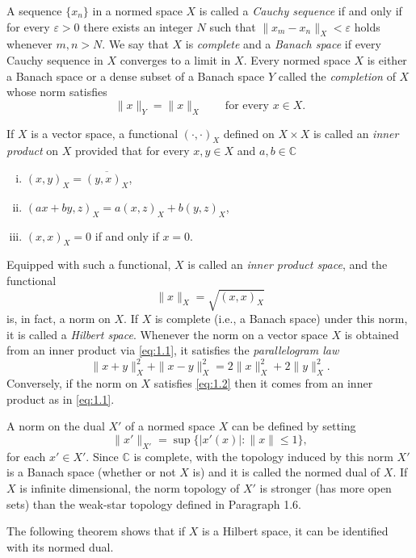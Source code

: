 \begin{para}
  A sequence $\{x_n\}$ in a normed space $X$ is called a \emph{Cauchy sequence}
  if and only if for every $\varepsilon>0$ there exists an integer $N$
  such that $\|x_m-x_n\|_X < \varepsilon$ holds whenever $m,n>N$.
  We say that $X$ is \emph{complete} and a \emph{Banach space} if every Cauchy sequence
  in $X$ converges to a limit in $X$. Every normed space $X$ is either a Banach space
  or a dense subset of a Banach space $Y$ called the \emph{completion} of $X$
  whose norm satisfies
  \[\|x\|_Y = \|x\|_X\qquad \text{for every } x\in X.\]
\end{para}


\begin{para}
  If $X$ is a vector space, a functional $(\cdot,\cdot)_X$ defined on $X\times X$
  is called an \emph{inner product} on $X$ provided that for every $x,y\in X$
  and $a,b\in \mathbb{C}$
  \begin{enumerate}[(i)]
    \item $(x,y)_X = \overline{(y,x)_X}$,
    \item $(ax+by, z)_X = a(x, z)_X + b(y, z)_X$,
    \item $(x,x)_X=0$ if and only if $x=0$.
  \end{enumerate}
  Equipped with such a functional, $X$ is called an \emph{inner product space},
  and the functional
  \begin{equation}\label{eq:1.1}
    \|x\|_X = \sqrt{(x,x)_X}
  \end{equation}
  is, in fact, a norm on $X$. If $X$ is complete (i.e., a Banach space) under this norm,
  it is called a \emph{Hilbert space}.
  Whenever the norm on a vector space $X$ is obtained from an inner product via \eqref{eq:1.1},
  it satisfies the \emph{parallelogram law}
  \begin{equation}\label{eq:1.2}
    \|x+y\|_X^2 + \|x-y\|_X^2 = 2\|x\|_X^2 + 2\|y\|_X^2.
  \end{equation}
  Conversely, if the norm on $X$ satisfies \eqref{eq:1.2} then it comes from an inner
  product as in \eqref{eq:1.1}.
\end{para}


\begin{para}
  A norm on the dual $X'$ of a normed space $X$ can be defined by setting
  \[\|x'\|_{X'} = \sup\{|x'(x)|\colon \|x\|\leq 1\},\]
  for each $x'\in X'$. Since $\mathbb{C}$ is complete, with the topology induced
  by this norm $X'$ is a Banach space (whether or not $X$ is) and it is called
  the normed dual of $X$. If $X$ is infinite dimensional, the norm topology
  of $X'$ is stronger (has more open sets) than the weak-star topology
  defined in Paragraph 1.6.

  The following theorem shows that if $X$ is a Hilbert space,
  it can be identified with its normed dual.
\end{para}


